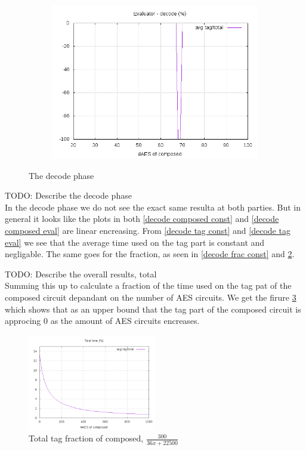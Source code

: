 \documentclass[10pt,a4paper]{article}
\newcommand{\todo}[1]{}
\renewcommand{\todo}[1]{{\color{red} TODO: {#1}} \\}
\begin{document}
\begin{figure}[h]
\begin{subfigure}[t]{0.3\textwidth}
        \includegraphics[width=\textwidth]{eval_decode_frac}
        \caption{}
        \label{decode frac eval}
    \end{subfigure}
    \caption{The decode phase}
\end{figure}

\todo{Describe the decode phase}
In the decode phase we do not see the exact same resulta at both parties. But in general it looks like the plots in both \ref{decode composed const} and \ref{decode composed eval} are linear encreasing. From \ref{decode tag const} and \ref{decode tag eval} we see that the average time used on the tag part is constant and negligable. The same goes for the fraction, as seen in \ref{decode frac const} and \ref{decode frac eval}.

\todo{Describe the overall results, total}
\bigskip
Summing this up to calculate a fraction of the time used on the tag pat of the composed circuit depandant on the number of AES circuits. We get the firure \ref{total frac} which shows that as an upper bound that the tag part of the composed circuit is approcing 0 as the amount of AES circuits encreases.

\begin{figure}[h]
    \centering
    \includegraphics[width=0.5\textwidth]{total_frac}
    \caption{Total tag fraction of composed, $\frac{300}{36x+22500}$}
    \label{total frac}
\end{figure}
\end{document}
